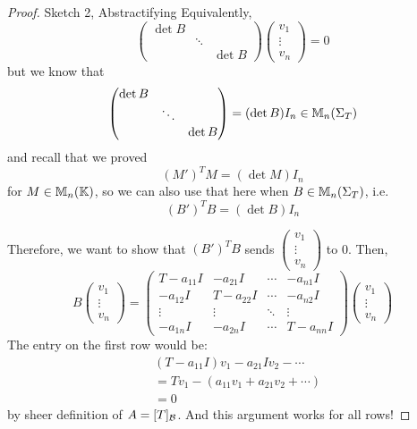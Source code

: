\begin{proof} {Sketch 2, Abstractifying}
    Equivalently, \[
        \begin{pmatrix}
            \det B &        &        \\
                   & \ddots &        \\
                   &        & \det B
        \end{pmatrix} \begin{pmatrix}
            v_1    \\
            \vdots \\
            v_n
        \end{pmatrix} = 0
    \]
    but we know that \[
        \begin{pmatrix}
            \det B &        &        \\
                   & \ddots &        \\
                   &        & \det B
        \end{pmatrix} = (\det B) I_n \in \mathbb{M}_n(\Sigma_T)
    \]
    and recall that we proved \[
        (M')^T M = (\det M) I_n
    \]
    for \(M  \in \mathbb{M}_n(\mathbb{K})\), so we can also use that here when \(B \in \mathbb{M}_n(\Sigma_T)\), i.e.
    \[
        (B')^T B = (\det B )I_n
    \]

    Therefore, we want to show that \((B')^T B\) sends \(\begin{pmatrix}
        v_1    \\
        \vdots \\
        v_n
    \end{pmatrix}\) to 0. Then,
    \[
        B \begin{pmatrix}
            v_1    \\
            \vdots \\
            v_n
        \end{pmatrix} = \begin{pmatrix}
            T - a_{11}I & -a_{21}I    & \cdots & -a_{n1}I  \\
            -a_{12}I    & T - a_{22}I & \cdots & -a_{n2}I  \\
            \vdots      & \vdots      & \ddots & \vdots    \\
            -a_{1n}I    & -a_{2n}I    & \cdots & T-a_{nn}I
        \end{pmatrix}\begin{pmatrix}
            v_1    \\
            \vdots \\
            v_n
        \end{pmatrix}
    \]
    The entry on the first row would be: \begin{align*}
         & (T - a_{11}I) v_1 - a_{21}Iv_2 - \cdots   \\
         & = Tv_1 - (a_{11}v_1 + a_{21}v_2 + \cdots) \\
         & = 0
    \end{align*}
    by sheer definition of \(A = [T]_{\mathcal{B}}\). And this argument works for all rows!
\end{proof}
